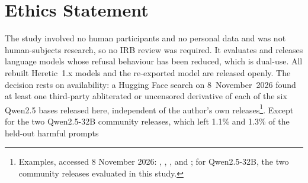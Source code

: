 \documentclass{article}
\begin{document}
\section*{Ethics Statement}
The study involved no human participants and no personal data and was not human-subjects research, so no IRB review
was required. It evaluates and releases language models whose refusal behaviour has been reduced, which is dual-use.
All rebuilt Heretic~1.x models and the re-exported model are released openly. The decision rests on availability: a
Hugging Face search on 8~November~2026 found at least one third-party abliterated or uncensored derivative of each of
the six Qwen2.5 bases released here, independent of the author's own releases\footnote{Examples, accessed 8 November
2026: ,
, ,
and ; for Qwen2.5-32B, the two community releases evaluated in this
study.}. Except for the two Qwen2.5-32B community releases, which left 1.1\% and 1.3\% of the held-out harmful prompts
\end{document}
